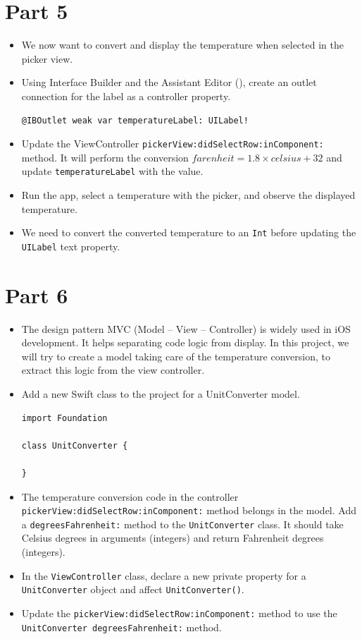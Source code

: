 \documentclass[a4paper,11pt]{scrartcl}
\begin{document}
\section*{Part 5}

\begin{itemize}
\item We now want to convert and display the temperature when selected in the picker view.
\item Using Interface Builder and the Assistant Editor (\keys{\Alt+\cmd+\return}), create an outlet connection for the label as a controller property.
\begin{lstlisting}
@IBOutlet weak var temperatureLabel: UILabel!
\end{lstlisting}
\item Update the ViewController \texttt{pickerView:didSelectRow:inComponent:} method. It will perform the conversion $farenheit=1.8\times celsius+32$ and update \texttt{temperatureLabel} with the value.
\item Run the app, select a temperature with the picker, and observe the displayed temperature.
\item We need to convert the converted temperature to an \texttt{Int} before updating the \texttt{UILabel} text property.
\end{itemize}

\section*{Part 6}

\begin{itemize}
\item The design pattern MVC (Model – View – Controller) is widely used in iOS development. It helps separating code logic from display. In this project, we will try to create a model taking care of the temperature conversion, to extract this logic from the view controller.
\item Add a new Swift class to the project for a UnitConverter model.
\begin{lstlisting}
import Foundation

class UnitConverter {

}
\end{lstlisting}
\item The temperature conversion code in the controller \texttt{pickerView:didSelectRow:inComponent:} method belongs in the model. Add a \texttt{degreesFahrenheit:} method to the \texttt{UnitConverter} class. It should take Celsius degrees in arguments (integers) and return Fahrenheit degrees (integers).
\item In the \texttt{ViewController} class, declare a new private property for a \texttt{UnitConverter} object and affect \texttt{UnitConverter()}.
\item Update the \texttt{pickerView:didSelectRow:inComponent:} method to use the \texttt{UnitConverter degreesFahrenheit:} method.
\end{itemize}
\end{document}
